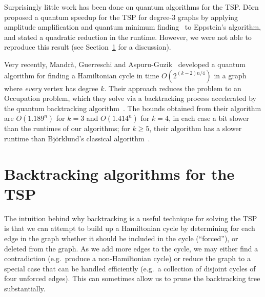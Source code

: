Surprisingly little work has been done on quantum algorithms for the TSP. D\"orn \cite{dorn2007} proposed a quantum speedup for the TSP for degree-3 graphs by applying amplitude amplification \cite{brassard1997} and quantum minimum finding~\cite{durr1996} to Eppstein's algorithm, and stated a quadratic reduction in the runtime. However, we were not able to reproduce this result (see Section~\ref{sec:backtrack-tsp} for a discussion).

Very recently, Mandr{\`a}, Guerreschi and Aspuru-Guzik~\cite{mandra2016} developed a quantum algorithm for finding a Hamiltonian cycle in time $O(2^{(k-2)n/4})$ in a graph where {\em every} vertex has degree $k$. Their approach reduces the problem to an Occupation problem, which they solve via a backtracking process accelerated by the quantum backtracking algorithm~\cite{montanaro2015}. The bounds obtained from their algorithm are $O(1.189^n)$ for $k = 3$ and $O(1.414^n)$ for $k=4$, in each case a bit slower than the runtimes of our algorithms; for $k \ge 5$, their algorithm has a slower runtime than Bj\"orklund's classical algorithm~\cite{bjorklund14}.




\section{Backtracking algorithms for the TSP}
\label{sec:backtrack-tsp}

The intuition behind why backtracking is a useful technique for solving the TSP is that we can attempt to build up a Hamiltonian cycle by determining for each edge in the graph whether it should be included in the cycle (``forced''), or deleted from the graph. As we add more edges to the cycle, we may either find a contradiction (e.g.\ produce a non-Hamiltonian cycle) or reduce the graph to a special case that can be handled efficiently (e.g.\ a collection of disjoint cycles of four unforced edges). This can sometimes allow us to prune the backtracking tree substantially.

